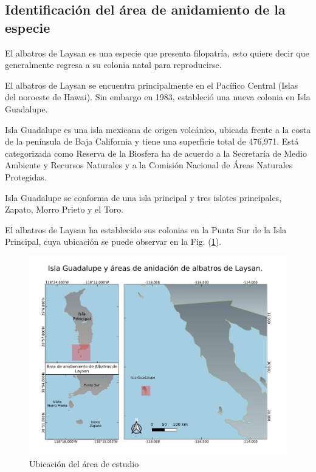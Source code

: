 \subsection{Identificación del área de anidamiento de la especie}

El albatros de Laysan es una especie que presenta filopatría, esto quiere decir
que generalmente regresa a su colonia natal para reproducirse.

El albatros de Laysan se encuentra principalmente en el Pacífico Central (Islas
del noroeste de Hawai). Sin embargo en 1983, estableció una nueva colonia en
Isla Guadalupe.

Isla Guadalupe es una isla mexicana de origen volcánico, ubicada frente a la
costa de la península de Baja California y tiene una superficie total de
476,971. Está categorizada como Reserva de la Biosfera ha de acuerdo a la
Secretaría de Medio Ambiente y Recursos Naturales y a la Comisión Nacional de
Áreas Naturales Protegidas.

Isla Guadalupe se conforma de una isla principal y tres islotes principales,
Zapato, Morro Prieto y el Toro.

El albatros de Laysan ha establecido sus colonias en la Punta Sur de la Isla
Principal, cuya ubicación se puede observar en la Fig.
(\ref{fig:ubicacionIslaGpe}).

\begin{figure}[h!]
    \includegraphics[scale=0.60]{figures/Isla Guadalupe.pdf}
    \caption{Ubicación del área de estudio}
    \label{fig:ubicacionIslaGpe}
    \centering
\end{figure}

